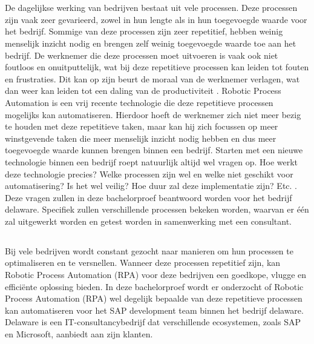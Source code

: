 
\chapter{}%
\label{ch:inleiding}

De dagelijkse werking van bedrijven bestaat uit vele processen. Deze processen zijn vaak zeer gevarieerd, zowel in hun lengte als in hun toegevoegde waarde voor het bedrijf. Sommige van deze processen zijn zeer repetitief, hebben weinig menselijk inzicht nodig en brengen zelf weinig toegevoegde waarde toe aan het bedrijf.
De werknemer die deze processen moet uitvoeren is vaak ook niet foutloos en onuitputtelijk, wat bij deze repetitieve processen kan leiden tot fouten en frustraties. Dit kan op zijn beurt de moraal van de werknemer verlagen, wat dan weer kan leiden tot een daling van de productiviteit \autocite{Liu2023}.
Robotic Process Automation is een vrij recente technologie die deze repetitieve processen mogelijks kan automatiseren. Hierdoor hoeft de werknemer zich niet meer bezig te houden met deze repetitieve taken, maar kan hij zich focussen op meer winstgevende taken die meer menselijk inzicht nodig hebben en dus meer toegevoegde waarde kunnen brengen binnen een bedrijf.
Starten met een nieuwe technologie binnen een bedrijf roept natuurlijk altijd wel vragen op. Hoe werkt deze technologie precies? Welke processen zijn wel en welke niet geschikt voor automatisering? Is het wel veilig? Hoe duur zal deze implementatie zijn? Etc. \autocite{Taulli2020}.
Deze vragen zullen in deze bachelorproef beantwoord worden voor het bedrijf delaware. Specifiek zullen verschillende processen bekeken worden, waarvan er één zal uitgewerkt worden en getest worden in samenwerking met een consultant.


\section{}%
\label{sec:probleemstelling}

Bij vele bedrijven wordt constant gezocht naar manieren om hun processen te optimaliseren en te versnellen. Wanneer deze processen repetitief zijn, kan Robotic Process Automation (RPA) voor deze bedrijven een goedkope, vlugge en efficiënte oplossing bieden.
In deze bachelorproef wordt er onderzocht of Robotic Process Automation (RPA) wel degelijk bepaalde van deze repetitieve processen kan automatiseren voor het SAP development team binnen het bedrijf delaware. Delaware is een IT-consultancybedrijf dat verschillende ecosystemen, zoals SAP en Microsoft, aanbiedt aan zijn klanten. 

